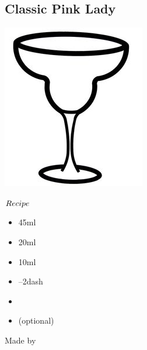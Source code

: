 \subsection{Classic Pink Lady}
\vspace{-7mm}
\hspace{49mm}
\includegraphics[scale=.05]{cocktail_glass_snow.jpg}
\vspace{2.5mm}
\begin{itembox}[l]{\boldmath $Recipe$}
\begin{itemize}
\setlength{\parskip}{0cm}
\setlength{\itemsep}{0cm}
\item \gin 45ml
\item \applejack 20ml
\item \lj 10ml
\item {}--2dash
\item {}
\item \cherry (optional)
\end{itemize}
\vspace{-4mm}
Made by \shake
\end{itembox}

